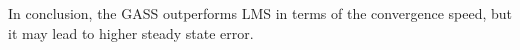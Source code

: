 \documentclass[10pt]{article}
\begin{document}
In conclusion, the GASS outperforms LMS in terms of the convergence speed, but it may lead to higher steady
state error.






\end{document}
